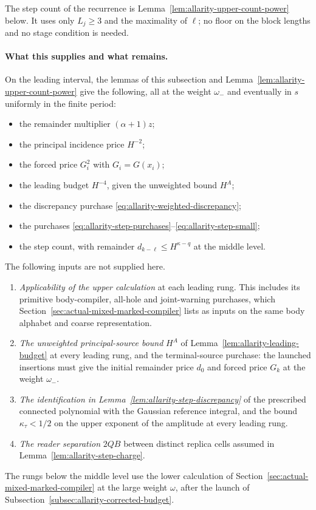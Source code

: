 The step count of the recurrence is
Lemma~\ref{lem:allarity-upper-count-power} below. It uses only $L_j\ge3$
and the maximality of $\ell$; no floor on the block lengths and no stage
condition is needed.

\paragraph{What this supplies and what remains.}
On the leading interval, the lemmas of this subsection and
Lemma~\ref{lem:allarity-upper-count-power} give the following, all at
the weight $\omega_-$ and eventually in $s$ uniformly in the finite
period:
\begin{itemize}
\item the remainder multiplier $(\alpha+1)z$;
\item the principal incidence price $H^{-2}$;
\item the forced price $G_i^2$ with $G_i=G(x_i)$;
\item the leading budget $H^{-4}$, given the unweighted bound $H^A$;
\item the discrepancy purchase \eqref{eq:allarity-weighted-discrepancy};
\item the purchases
 \eqref{eq:allarity-step-purchases}--\eqref{eq:allarity-step-small};
\item the step count, with remainder $d_{k-\ell}\le H^{\kappa-q}$ at the
 middle level.
\end{itemize}
The following inputs are not supplied here.
\begin{enumerate}
\item \emph{Applicability of the upper calculation} at each leading rung.
 This includes its primitive body-compiler, all-hole and joint-warning
 purchases, which Section~\ref{sec:actual-mixed-marked-compiler} lists as
 inputs on the same body alphabet and coarse representation.
\item \emph{The unweighted principal-source bound} $H^A$ of
 Lemma~\ref{lem:allarity-leading-budget} at every leading rung, and the
 terminal-source purchase: the launched insertions must give the initial
 remainder price $d_0$ and forced price $G_k$ at the weight $\omega_-$.
\item \emph{The identification in Lemma~\ref{lem:allarity-step-discrepancy}}
 of the prescribed connected polynomial with the Gaussian reference
 integral, and the bound $\kappa_\tau<1/2$ on the upper exponent of the
 amplitude at every leading rung.
\item \emph{The reader separation} $2QB$ between distinct replica cells
 assumed in Lemma~\ref{lem:allarity-step-charge}.
\end{enumerate}
The rungs below the middle level use the lower calculation of
Section~\ref{sec:actual-mixed-marked-compiler} at the large weight
$\omega$, after the launch of
Subsection~\ref{subsec:allarity-corrected-budget}.

